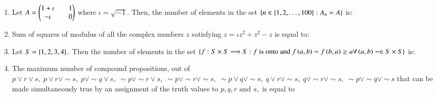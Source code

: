 \documentclass[journal]{IEEEtran}
\theoremstyle{remark}
\begin{document}
\begin{enumerate}
\item  Let $A = \begin{pmatrix}1+\iota && 1\\-\iota &&0\end{pmatrix} $ where $\iota=\sqrt{-1}.$ Then, the number of elements in the set $ \left\{n \in \{1, 2, \ldots, 100\} : A_n = A\right\} $  is:\\

\item Sum of squares of modulus of all the complex numbers $z$ satisfying ${z} = \iota z^2 + z^2 - z$ is equal to:\\

\item Let $S = \left\{1, 2, 3, 4\right\}.$ Then the number of elements in the set $\left\{f : S \times S \Longrightarrow S : f \text{ is onto and }f\left(a,b\right)=f\left(b,a\right) \geq a \forall \left(a,b\right)=\in  S \times S\right\}$ is:\\

\item  The maximum number of compound propositions, out of $p \lor r \lor s, \; p \lor r \lor \sim s, \; p \lor \sim q \lor s, \; \sim p \lor \sim r \lor s, \; \sim p \lor \sim r \lor \sim s, \; \sim p \lor q \lor \sim s, \; q \lor r \lor \sim s, \; q \lor \sim r \lor \sim s, \; \sim p \lor \sim q \lor \sim s$ that can be made simultaneously true by an assignment of the truth values to $p, q, r \text{ and } s,$ is equal to


\end{enumerate}
\end{document}
